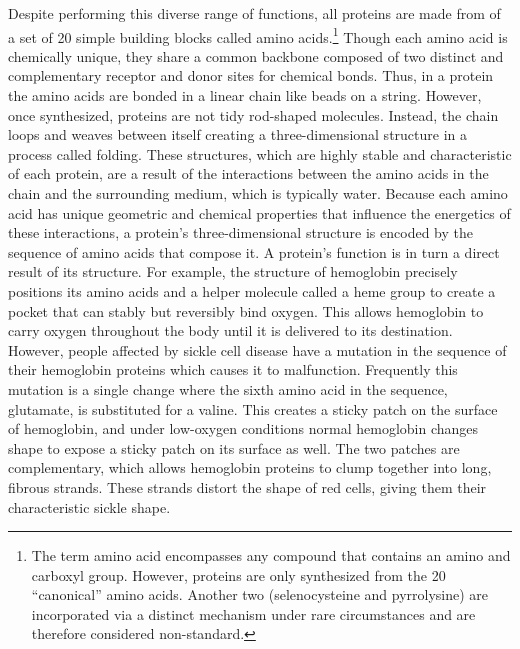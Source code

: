 Despite performing this diverse range of functions, all proteins are made from of a set of 20 simple building blocks called amino acids.\footnote{The term amino acid encompasses any compound that contains an amino and carboxyl group. However, proteins are only synthesized from the 20 ``canonical'' amino acids. Another two (selenocysteine and pyrrolysine) are incorporated via a distinct mechanism under rare circumstances and are therefore considered non-standard.} Though each amino acid is chemically unique, they share a common backbone composed of two distinct and complementary receptor and donor sites for chemical bonds. Thus, in a protein the amino acids are bonded in a linear chain like beads on a string. However, once synthesized, proteins are not tidy rod-shaped molecules. Instead, the chain loops and weaves between itself creating a three-dimensional structure in a process called folding. These structures, which are highly stable and characteristic of each protein, are a result of the interactions between the amino acids in the chain and the surrounding medium, which is typically water. Because each amino acid has unique geometric and chemical properties that influence the energetics of these interactions, a protein's three-dimensional structure is encoded by the sequence of amino acids that compose it. A protein's function is in turn a direct result of its structure. For example, the structure of hemoglobin precisely positions its amino acids and a helper molecule called a heme group to create a pocket that can stably but reversibly bind oxygen. This allows hemoglobin to carry oxygen throughout the body until it is delivered to its destination. However, people affected by sickle cell disease have a mutation in the sequence of their hemoglobin proteins which causes it to malfunction. Frequently this mutation is a single change where the sixth amino acid in the sequence, glutamate, is substituted for a valine. This creates a sticky patch on the surface of hemoglobin, and under low-oxygen conditions normal hemoglobin changes shape to expose a sticky patch on its surface as well. The two patches are complementary, which allows hemoglobin proteins to clump together into long, fibrous strands. These strands distort the shape of red cells, giving them their characteristic sickle shape.

